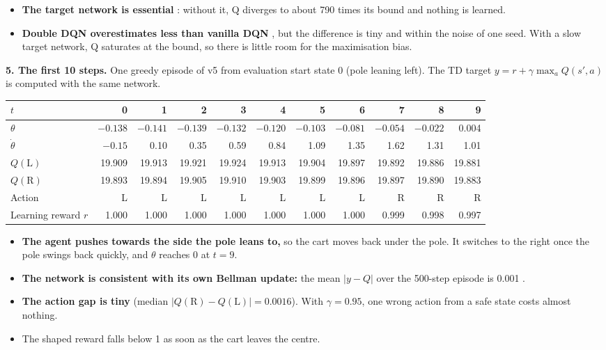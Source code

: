 \begin{itemize}
  \item \textbf{The target network is essential} \pass: without it, Q diverges to about 790 times its bound and nothing is learned.
  \item \textbf{Double DQN overestimates less than vanilla DQN} \pass, but the difference is tiny and within the noise of one seed. With a slow target network, Q saturates at the bound, so there is little room for the maximisation bias.
\end{itemize}

\textbf{5. The first 10 steps.} One greedy episode of v5 from evaluation start state 0 (pole leaning left). The TD target $y = r + \gamma \max_a Q(s', a)$ is computed with the same network.

\begin{center}
\footnotesize
\setlength{\tabcolsep}{4.5pt}
\begin{tabular}{@{}l*{10}{r}@{}}
  \toprule
  $t$ & 0 & 1 & 2 & 3 & 4 & 5 & 6 & 7 & 8 & 9 \\
  \midrule
  $\theta$ & $-0.138$ & $-0.141$ & $-0.139$ & $-0.132$ & $-0.120$ & $-0.103$ & $-0.081$ & $-0.054$ & $-0.022$ & 0.004 \\
  $\dot\theta$ & $-0.15$ & 0.10 & 0.35 & 0.59 & 0.84 & 1.09 & 1.35 & 1.62 & 1.31 & 1.01 \\
  $Q(\text{L})$ & 19.909 & 19.913 & 19.921 & 19.924 & 19.913 & 19.904 & 19.897 & 19.892 & 19.886 & 19.881 \\
  $Q(\text{R})$ & 19.893 & 19.894 & 19.905 & 19.910 & 19.903 & 19.899 & 19.896 & 19.897 & 19.890 & 19.883 \\
  Action & L & L & L & L & L & L & L & R & R & R \\
  Learning reward $r$ & 1.000 & 1.000 & 1.000 & 1.000 & 1.000 & 1.000 & 1.000 & 0.999 & 0.998 & 0.997 \\
  \bottomrule
\end{tabular}
\end{center}

\begin{itemize}
  \item \textbf{The agent pushes towards the side the pole leans to,} so the cart moves back under the pole. It switches to the right once the pole swings back quickly, and $\theta$ reaches 0 at $t = 9$.
  \item \textbf{The network is consistent with its own Bellman update:} the mean $|y - Q|$ over the 500-step episode is 0.001 \pass.
  \item \textbf{The action gap is tiny} (median $|Q(\text{R}) - Q(\text{L})| = 0.0016$). With $\gamma = 0.95$, one wrong action from a safe state costs almost nothing.
  \item The shaped reward falls below 1 as soon as the cart leaves the centre.
\end{itemize}

